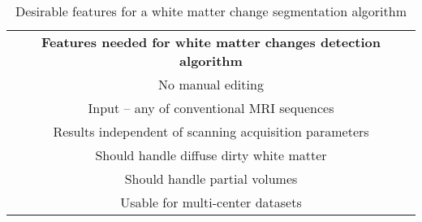 \begin{table} 
    \begin{tabular}{ c }
        \textbf{Features needed for white matter changes detection algorithm}\\
        No manual editing \\ 
        Input – any of conventional MRI sequences \\ 
        Results independent of scanning acquisition parameters \\ 
        Should handle diffuse dirty white matter \\ 
        Should handle partial volumes \\ 
        Usable for multi-center datasets \\ 
    \end{tabular} 
    \caption{Desirable features for a white matter change segmentation algorithm } 
\end{table}
    